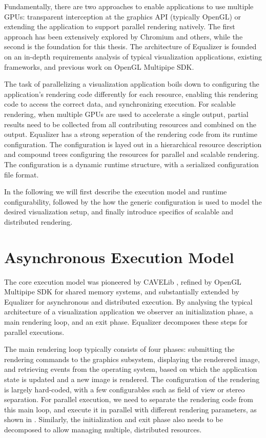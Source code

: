 Fundamentally, there are two approaches to enable applications to use multiple
GPUs: transparent interception at the graphics API (typically OpenGL) or
extending the application to support parallel rendering natively. The first
approach has been extensively explored by Chromium and others, while the second
is the foundation for this thesis. The architecture of Equalizer is founded on
an in-depth requirements analysis of typical visualization applications,
existing frameworks, and previous work on OpenGL Multipipe SDK.

The task of parallelizing a visualization application boils down to configuring
the application's rendering code differently for each resource, enabling this
rendering code to access the correct data, and synchronizing execution. For
scalable rendering, when multiple GPUs are used to accelerate a single output,
partial results need to be collected from all contributing resources and
combined on the output. Equalizer has a strong seperation of the rendering code
from its runtime configuration. The configuration is layed out in a hierarchical
resource description and compound trees configuring the resources for parallel
and scalable rendering. The configuration is a dynamic runtime structure, with a
serialized configuration file format.

In the following we will first describe the execution model and runtime
configurability, followed by the how the generic configuration is used to model
the desired visualization setup, and finally introduce specifics of scalable and
distributed rendering.

\section{Asynchronous Execution Model}

The core execution model was pioneered by CAVELib \cite{DACNCCGHPSNS:97},
refined by OpenGL Multipipe SDK for shared memory systems, and substantially
extended by Equalizer for asynchronous and distributed execution. By analysing
the typical architecture of a visualization application we observer an
initialization phase, a main rendering loop, and an exit phase. Equalizer
decomposes these steps for parallel executions.

The main rendering loop typically consists of four phases: submitting the
rendering commands to the graphics subsystem, displaying the renderered image,
and retrieving events from the operating system, based on which the application
state is updated and a new image is rendered. The configuration of the rendering
is largely hard-coded, with a few configurables such as field of view or stereo
separation. For parallel execution, we need to separate the rendering code from
this main loop, and execute it in parallel with different rendering parameters,
as shown in . Similarly, the initialization and exit phase
also needs to be decomposed to allow managing multiple, distributed resources.

